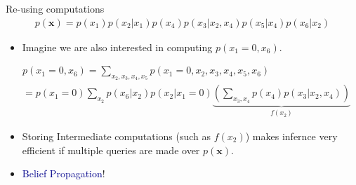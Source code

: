 \documentclass[10pt]{beamer}
\def\x{\ve{x}}
\newcommand{\ve}[1]{\boldsymbol{#1}}
\begin{document}
\begin{frame}{Re-using computations}
\begin{align*}
p(\x)=p(x_1)p(x_2|x_1)p(x_4)p(x_3|x_2,x_4)p(x_5|x_4)p(x_6|x_2)
\end{align*}
\begin{itemize}
\item Imagine we are also interested in computing $p(x_1=0,x_6)$.
\end{itemize}
\begin{align*}
&p(x_1=0,x_6)=\sum_{x_2,x_3,x_4,x_5} p(x_1=0,x_2,x_3,x_4,x_5,x_6)\\
&=p(x_1=0)\sum_{x_2}p(x_6|x_2) p(x_2|x_1=0) \underbrace{\left(\sum_{x_3,x_4} p(x_4)p(x_3|x_2,x_4)\right)}_{f(x_2) }
\end{align*}
\begin{itemize}
\item Storing Intermediate computations (such as $f(x_2)$) makes infernce very efficient if multiple queries are made over $p(\x)$.
\item \textcolor{darkblue}{Belief Propagation}! 
\end{itemize}
\end{frame}
\end{document}
